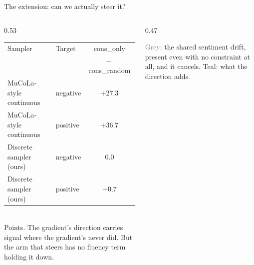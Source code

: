\documentclass{beamer}
\begin{document}
\begin{frame}{The extension: can we actually steer it?}
  \begin{columns}[T]
    \begin{column}{0.53\textwidth}
      \scriptsize
      \setlength{\tabcolsep}{3pt}
      \begin{tabular}{llc}
        \toprule
        Sampler & Target & \textsf{cons\_only} \\
                &        & $-\ $\textsf{cons\_random} \\
        \midrule
        MuCoLa-style continuous & negative & $+27.3$ \\
        MuCoLa-style continuous & positive & $+36.7$ \\
        Discrete sampler (ours) & negative & $0.0$ \\
        Discrete sampler (ours) & positive & $+0.7$ \\
        \bottomrule
      \end{tabular}
      \\[0.3em]
      {\scriptsize Points. The  gradient's direction carries signal where
      the  gradient's never did. But the arm that steers has no fluency term
      holding it down.}
    \end{column}
    \begin{column}{0.47\textwidth}
      \begin{center}
      \end{center}
      \vspace{-0.1em}
      {\scriptsize \textcolor{gray}{Grey}: the shared sentiment drift, present even with no
      constraint at all, and it cancels. \textcolor{imsteal}{Teal}: what the direction adds.}
    \end{column}
  \end{columns}
  \vspace{0.2em}
  \begin{center}\small
  \end{center}
\end{frame}
\end{document}
